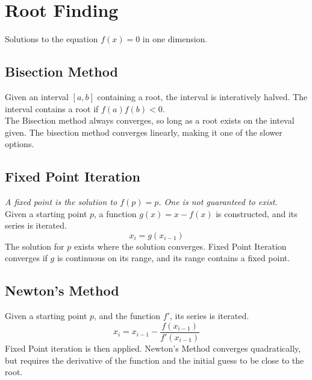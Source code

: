 \documentclass[10pt]{article}
\numberwithin{equation}{subsection}
\numberwithin{equation}{subsection}
\begin{document}
    \section{Root Finding}

        Solutions to the equation $f(x) = 0$ in one dimension.

        \subsection{Bisection Method}

            Given an interval $[a, b]$ containing a root, the interval is
            interatively halved. The interval contains a root if $f(a)f(b)<0$.\\

            The Bisection method always converges, so long as a root exists
            on the inteval given. The bisection method converges linearly,
            making it one of the slower options.

            

        \subsection{Fixed Point Iteration}

            \textit{A fixed point is the solution to $f(p) = p$. One is not guaranteed
            to exist.}\\

            Given a starting point $p$, a function $g(x) = x - f(x)$ is
            constructed, and its series is iterated.
            $$x_{i} = g(x_{i-1})$$
            The solution for $p$ exists where the solution converges. Fixed
            Point Iteration converges if $g$ is continuous on its range, and
            its range contains a fixed point.

            

        \subsection{Newton's Method}

            Given a starting point $p$, and the function $f'$, its series is
            iterated.
            $$x_{i} = x_{i-1} - \frac{f(x_{i-1})}{f'(x_{i-1})}$$
            Fixed Point iteration is then applied. Newton's Method converges
            quadratically, but requires the derivative
            of the function and the initial guess to be close to the root.
\end{document}
